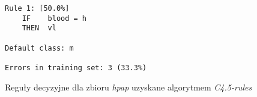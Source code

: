 \begin{figure}
\begin{verbatim}
Rule 1: [50.0%]
    IF    blood = h
    THEN  vl

Default class: m

Errors in training set: 3 (33.3%)
\end{verbatim}
\caption{Reguły decyzyjne dla zbioru \emph{hpap} uzyskane algorytmem \emph{C4.5-rules}}
\label{p2t2-hpap-rules-c45}
\end{figure}
